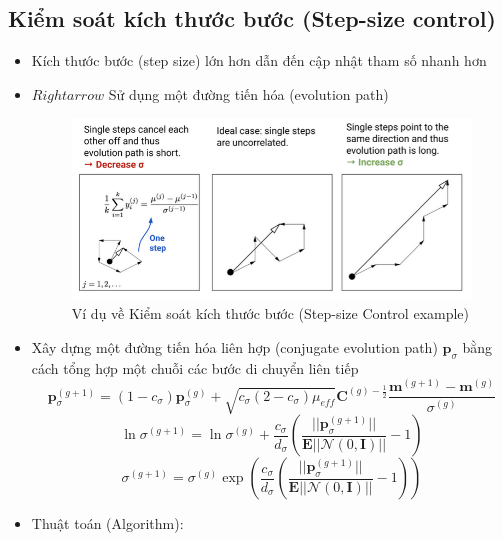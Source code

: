\documentclass{book}
\begin{document}
\subsection{Kiểm soát kích thước bước (Step-size control)}
\begin{itemize}
    \item Kích thước bước (step size) lớn hơn dẫn đến cập nhật tham số nhanh hơn
    \item[] $Rightarrow$ Sử dụng một đường tiến hóa (evolution path)
    \begin{figure}[H]
        \centering
        \includegraphics[width=\textwidth]{images/step_size_control.png}
        \caption{Ví dụ về Kiểm soát kích thước bước (Step-size Control example)}
        \label{fig:step_size_control}
    \end{figure}
    \item Xây dựng một đường tiến hóa liên hợp (conjugate evolution path) $\mathbf{p}_\sigma$ bằng cách tổng hợp một chuỗi các bước di chuyển liên tiếp
    \begin{equation*}
            \mathbf{p}_\sigma^{(g+1)}=(1-c_{\sigma})\mathbf{p}_{\sigma}^{(g)}+\sqrt{c_{\sigma}(2-c_\sigma)\mu_{eff}}\mathbf{C}^{(g)-\frac{1}{2}}\frac{\mathbf{m}^{(g+1)}-\mathbf{m}^{(g)}}{\sigma^{(g)}}
    \end{equation*}
    \begin{equation*}
        \ln{\sigma^{(g+1)}}=\ln{\sigma^{(g)}}+\frac{c_{\sigma}}{d_{\sigma}}(\frac{||\mathbf{p}_{\sigma}^{(g+1)}||}{\mathbf{E}||\mathcal{N}(0,\mathbf{I})||}-1)
    \end{equation*}
    \begin{equation*}
        \sigma^{(g+1)}=\sigma^{(g)}\exp(\frac{c_{\sigma}}{d_{\sigma}}(\frac{||\mathbf{p}_{\sigma}^{(g+1)}||}{\mathbf{E}||\mathcal{N}(0,\mathbf{I})||}-1))
    \end{equation*}
    \item Thuật toán (Algorithm):
    \begin{algorithm}

\end{algorithm}
\end{itemize}
\end{document}
